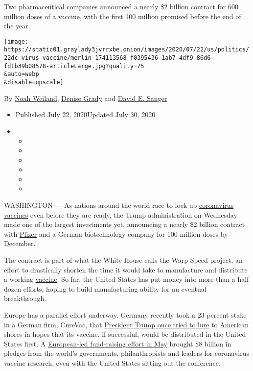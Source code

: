 Two pharmaceutical companies announced a nearly \$2 billion contract for
600 million doses of a vaccine, with the first 100 million promised
before the end of the year.

\texttt{[image: https://static01.graylady3jvrrxbe.onion/images/2020/07/22/us/politics/22dc-virus-vaccine/merlin\_174113568\_f0395436-1ab7-4df9-86d6-fd1b39b08578-articleLarge.jpg?quality=75\\\&auto=webp\\\&disable=upscale]}

By \href{https://www.nytimes3xbfgragh.onion/by/noah-weiland}{Noah
Weiland},
\href{https://www.nytimes3xbfgragh.onion/by/denise-grady}{Denise Grady}
and \href{https://www.nytimes3xbfgragh.onion/by/david-e-sanger}{David E.
Sanger}

\begin{itemize}
\item
  Published July 22, 2020Updated July 30, 2020
\item
  \begin{itemize}
  \item
  \item
  \item
  \item
  \item
  \item
  \end{itemize}
\end{itemize}

WASHINGTON --- As nations around the world race to lock up
\href{https://www.nytimes3xbfgragh.onion/2020/07/27/health/moderna-vaccine-covid.html}{coronavirus
vaccines} even before they are ready, the Trump administration on
Wednesday made one of the largest investments yet, announcing a nearly
\$2 billion contract with
\href{https://www.nytimes3xbfgragh.onion/2020/07/27/health/moderna-vaccine-covid.html}{Pfizer}
and a German biotechnology company for 100 million doses by December.

The contract is part of what the White House calls the Warp Speed
project, an effort to drastically shorten the time it would take to
manufacture and distribute a working
\href{https://www.nytimes3xbfgragh.onion/2020/07/22/upshot/vaccine-coronavirus-government-purchase.html}{vaccine}.
So far, the United States has put money into more than a half dozen
efforts, hoping to build manufacturing ability for an eventual
breakthrough.

Europe has a parallel effort underway. Germany recently took a 23
percent stake in a German firm, CureVac, that
\href{https://www.nytimes3xbfgragh.onion/2020/03/15/world/europe/cornonavirus-vaccine-us-germany.html}{President
Trump once tried to lure} to American shores in hopes that its vaccine,
if successful, would be distributed in the United States first. A
\href{https://www.nytimes3xbfgragh.onion/2020/05/04/world/europe/eu-coronavirus-vaccine.html}{European-led
fund-raising effort in May} brought \$8 billion in pledges from the
world's governments, philanthropists and leaders for coronavirus vaccine
research, even with the United States sitting out the conference.

